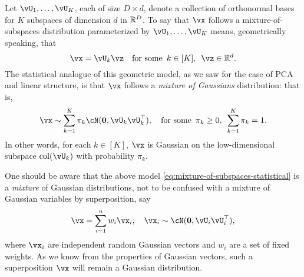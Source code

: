 \documentclass[../../book-main.tex]{subfiles}
\begin{document}
Let $\vU_1, \dots, \vU_K$, each of size $D \times d$, denote a collection of orthonormal bases for $K$ subspaces of dimension $d$ in $\mathbb{R}^D$.
To say that $\vx$ follows a mixture-of-subspaces distribution parameterized by $\vU_1, \dots, \vU_K$ means, geometrically speaking,
that 
\begin{equation}\label{eq:mixture-of-subspaces-geometric}
    \vx = \vU_k \vz  \quad \text{for some} \enspace k \in [K],\enspace \vz \in \R^d.
\end{equation}
The statistical analogue of this geometric model, as we saw for the case of PCA and linear structure,
is that $\vx$ follows a \textit{mixture of Gaussians} distribution: that is,
\begin{equation}\label{eq:mixture-of-subspaces-statistical}
    \vx \sim \sum_{k=1}^K \pi_k \cN(\mathbf{0}, \vU_k\vU_k^\top), \quad \text{for some} \enspace \pi_k \geq 0,\enspace \sum_{k=1}^K \pi_k = 1.
\end{equation}
In other words, for each $k \in [K]$, $\vx$ is Gaussian on the low-dimensional
subspace $\mathop{\mathrm{col}}(\vU_k)$  with probability $\pi_k$.

\begin{remark}
One should be aware that the above model
    \eqref{eq:mixture-of-subspaces-statistical} is a \textit{mixture} of
    Gaussian distributions, not to be confused with a mixture of Gaussian
    variables by superposition, say 
\begin{equation}
    \vx = \sum_{i=1}^n w_i \vx_i, \quad \vx_i \sim \cN(\mathbf{0}, \vU_i\vU_i^\top),
\end{equation}
where $\vx_i$ are independent random Gaussian vectors and $w_i$ are a set of fixed weights. As we know from the properties of Gaussian vectors, such a superposition $\vx$ will remain a Gaussian distribution.
\end{remark}
\end{document}
